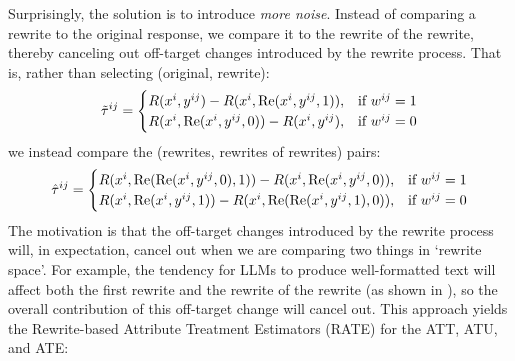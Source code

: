\documentclass{article}
\begin{document}
Surprisingly, the solution is to introduce \emph{more noise}. Instead of comparing a rewrite to the original response, we compare it to the rewrite of the rewrite, thereby canceling out off-target changes introduced by the rewrite process. That is, rather than selecting (original, rewrite):
\[
\tilde{\tau}^{ij} = 
\begingroup
\setlength\arraycolsep{1pt}
\renewcommand{\arraystretch}{0.9}
\begin{cases}
  R(x^i, y^{ij}) - R(x^i, \text{Re}(x^i, y^{ij}, 1)), & \text{if } w^{ij} = 1 \\
  R(x^i, \text{Re}(x^i, y^{ij}, 0)) - R(x^i, y^{ij}), & \text{if } w^{ij} = 0
\end{cases}
\endgroup
\]
we instead compare the (rewrites, rewrites of rewrites) pairs:
\[
\hat{\tau}^{ij} = 
\begingroup
\setlength\arraycolsep{1pt}
\renewcommand{\arraystretch}{0.9}
\begin{cases}
  R(x^i, \text{Re}(\text{Re}(x^i, y^{ij}, 0), 1)) - R(x^i, \text{Re}(x^i, y^{ij}, 0)), & \text{if } w^{ij} = 1 \\
  R(x^i, \text{Re}(x^i, y^{ij}, 1)) - R(x^i, \text{Re}(\text{Re}(x^i, y^{ij}, 1), 0)), & \text{if } w^{ij} = 0
\end{cases}
\endgroup
\]
The motivation is that the off-target changes introduced by the rewrite process will, in expectation, cancel out when we are comparing two things in `rewrite space'. For example, the tendency for LLMs to produce well-formatted text will affect both the first rewrite and the rewrite of the rewrite (as shown in ), so the overall contribution of this off-target change will cancel out. This approach yields the Rewrite-based Attribute Treatment Estimators (RATE) for the ATT, ATU, and ATE:
\end{document}
